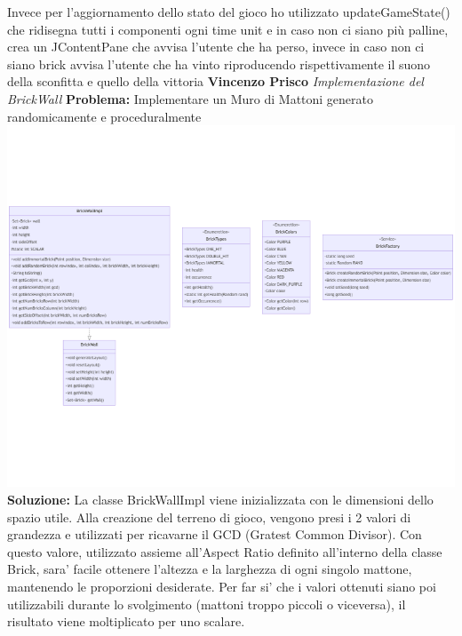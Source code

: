 \documentclass[a4paper,12pt]{report}
\begin{document}
Invece per l'aggiornamento dello stato del gioco ho utilizzato updateGameState() che ridisegna tutti i componenti ogni time unit e in caso non ci siano più palline, crea un JContentPane che avvisa l'utente che ha perso, invece in caso non ci siano brick avvisa l'utente che ha vinto riproducendo rispettivamente il suono della sconfitta e quello della vittoria
\newline
\newline
\newline
\newline
\textbf{Vincenzo Prisco}
\newline
\newline
\textit{Implementazione del BrickWall}
\newline
\newline
\textbf{Problema:} Implementare un Muro di Mattoni generato randomicamente e proceduralmente
\newline
\includegraphics[width=\textwidth]{bricks.png}
\newline
\textbf{Soluzione:} La classe BrickWallImpl viene inizializzata con le dimensioni dello spazio utile.\newline
Alla creazione del terreno di gioco, vengono presi i 2 valori di grandezza e utilizzati per ricavarne il GCD (Gratest Common Divisor). Con questo valore, utilizzato assieme all'Aspect Ratio definito all'interno della classe Brick, sara' facile ottenere l'altezza e la larghezza di ogni singolo mattone, mantenendo le proporzioni desiderate.
Per far si' che i valori ottenuti siano poi utilizzabili durante lo svolgimento (mattoni troppo piccoli o viceversa), il risultato viene moltiplicato per uno scalare.\newline
\end{document}
